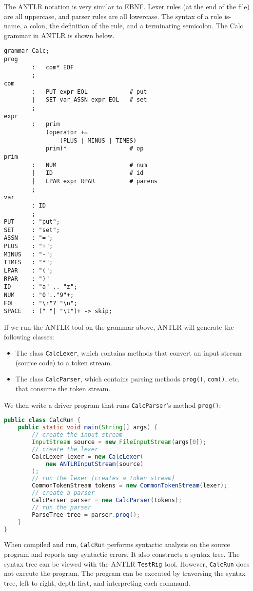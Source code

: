 \documentclass[a4paper, openany]{memoir}
\begin{document}
The ANTLR notation is very similar to EBNF. Lexer rules (at the end of the file) are all uppercase, and parser rules are all lowercase. The syntax of a rule is- name, a colon, the definition of the rule, and a terminating semicolon. The Calc grammar in ANTLR is shown below.
\begin{verbatim}
grammar Calc;
prog
        :   com* EOF
        ;
com
        :   PUT expr EOL            # put
        |   SET var ASSN expr EOL   # set
        ;
expr
        :   prim
            (operator += 
                (PLUS | MINUS | TIMES)
            prim)*                  # op
prim
        :   NUM                     # num
        |   ID                      # id
        |   LPAR expr RPAR          # parens
        ;
var
        : ID
        ;
PUT     : "put";
SET     : "set";
ASSN    : "=";
PLUS    : "+";
MINUS   : "-";
TIMES   : "*";
LPAR    : "(";
RPAR    : ")"
ID      : "a" .. "z";
NUM     : "0".."9"+;
EOL     : "\r"? "\n";
SPACE   : (" "| "\t")+ -> skip;
\end{verbatim}
If we run the ANTLR tool on the grammar above, ANTLR will generate the following classes:
\begin{itemize}
    \item The class \texttt{CalcLexer}, which contains methods that convert an input stream (source code) to a token stream.
    \item The class \texttt{CalcParser}, which contains parsing methods \texttt{prog()}, \texttt{com()}, etc. that consume the token stream.
\end{itemize}
We then write a driver program that runs \texttt{CalcParser}'s method \texttt{prog()}:
\begin{lstlisting}[language=java]
public class CalcRun {
    public static void main(String[] args) {
        // create the input stream
        InputStream source = new FileInputStream(args[0]);
        // create the lexer
        CalcLexer lexer = new CalcLexer(
            new ANTLRInputStream(source)
        );
        // run the lexer (creates a token stream)
        CommonTokenStream tokens = new CommonTokenStream(lexer);
        // create a parser
        CalcParser parser = new CalcParser(tokens);
        // run the parser
        ParseTree tree = parser.prog();
    }
}
\end{lstlisting}

When compiled and run, \texttt{CalcRun} performs syntactic analysis on the source program and reports any syntactic errors. It also constructs a syntax tree. The syntax tree can be viewed with the ANTLR \texttt{TestRig} tool. However, \texttt{CalcRun} does not execute the program. The program can be executed by traversing the syntax tree, left to right, depth first, and interpreting each command.
\end{document}
